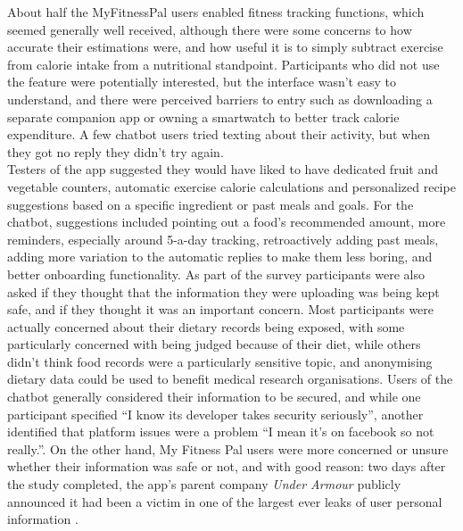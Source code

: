 About half the MyFitnessPal users enabled fitness tracking functions, which seemed generally well received, although there were some concerns to how accurate their estimations were, and how useful it is to simply subtract exercise from calorie intake from a nutritional standpoint. Participants who did not use the feature were potentially interested, but the interface wasn't easy to understand, and there were perceived barriers to entry such as downloading a separate companion app or owning a smartwatch to better track calorie expenditure. A few chatbot users tried texting about their activity, but when they got no reply they didn't try again.\\
Testers of the app suggested they would have liked to have dedicated fruit and vegetable counters, automatic exercise calorie calculations and personalized recipe suggestions based on a specific ingredient or past meals and goals. For the chatbot, suggestions included pointing out a food's recommended amount, more reminders, especially around 5-a-day tracking, retroactively adding past meals, adding more variation to the automatic replies to make them less boring, and better onboarding functionality.
As part of the survey participants were  also asked if they thought that the information they were uploading was being kept safe, and if they thought it was an important concern. Most participants were actually concerned about their dietary records being exposed, with some particularly concerned with being judged because of their diet, while others didn't think food records were a particularly sensitive topic, and anonymising dietary data could be used to benefit medical research organisations. Users of the chatbot generally considered their information to be secured, and while one participant specified ``I know its developer takes security seriously'', another identified that platform issues were a problem ``I mean it's on facebook so not really.''. On the other hand, My Fitness Pal users were more concerned or unsure whether their information was safe or not, and with good reason: two days after the study completed, the app's parent company \textit{Under Armour} publicly announced it had been a victim in one of the largest ever leaks of user personal information \cite{underarmour}.
